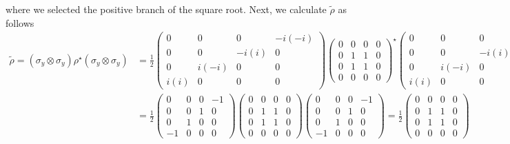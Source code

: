 \documentclass[10pt, a4paper]{article}
\begin{document}
{\begin{enumerate}
  where we selected the positive branch of the square root. Next, we calculate $\tilde{\rho}$ as follows 
  \begin{align*}
    \tilde{\rho} =  (\sigma_y \otimes \sigma_y) \rho^{\star}(\sigma_y \otimes \sigma_y) &= \frac{1}{2}
    \begin{pmatrix}
      0 & 0 & 0 & -i(-i)\\
      0 & 0 & -i(i) & 0\\
      0 & i(-i) & 0 & 0\\
      i(i) & 0 & 0 & 0
    \end{pmatrix}
    \begin{pmatrix}
      0 & 0 & 0 & 0\\
      0 & 1 & 1 & 0\\
      0 & 1 & 1 & 0\\
      0 & 0 & 0 & 0
    \end{pmatrix}^{\star}
    \begin{pmatrix}
      0 & 0 & 0 & -i(-i)\\
      0 & 0 & -i(i) & 0\\
      0 & i(-i) & 0 & 0\\
      i(i) & 0 & 0 & 0
    \end{pmatrix}\\
    &= \frac{1}{2}\begin{pmatrix}
      0 & 0 & 0 & -1\\
      0 & 0 & 1 & 0\\
      0 & 1 & 0 & 0\\
      -1 & 0 & 0 & 0
    \end{pmatrix}
    \begin{pmatrix}
      0 & 0 & 0 & 0\\
      0 & 1 & 1 & 0\\
      0 & 1 & 1 & 0\\
      0 & 0 & 0 & 0
    \end{pmatrix}
    \begin{pmatrix}
      0 & 0 & 0 & -1\\
      0 & 0 & 1 & 0\\
      0 & 1 & 0 & 0\\
      -1 & 0 & 0 & 0
    \end{pmatrix}
    = 
    \frac{1}{2}
    \begin{pmatrix}
      0 & 0 & 0 & 0\\
      0 & 1 & 1 & 0\\
      0 & 1 & 1 & 0\\
      0 & 0 & 0 & 0
    \end{pmatrix}

\end{align*}
\end{enumerate}}
\end{document}
